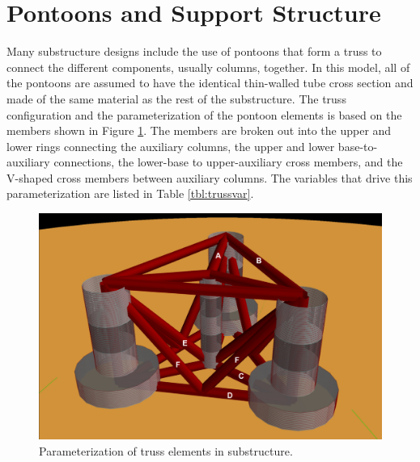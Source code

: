 \section{Pontoons and Support Structure}
Many substructure designs include the use of pontoons that form a truss
to connect the different components, usually columns, together.  In this
model, all of the pontoons are assumed to have the identical thin-walled
tube cross section and made of the same material as the rest of the
substructure.  The truss configuration and the parameterization of the
pontoon elements is based on the members shown in Figure
\ref{fig:pontoon}.  The members are broken out into the upper and lower
rings connecting the auxiliary columns, the upper and lower
base-to-auxiliary connections, the lower-base to upper-auxiliary cross
members, and the V-shaped cross members between auxiliary columns.  The
variables that drive this parameterization are listed in Table
\ref{tbl:trussvar}.
%
\begin{figure}[htb]
  \begin{center}
    \includegraphics[width=4.5in]{figs/semi.pdf}
    \caption{Parameterization of truss elements in substructure.}
    \label{fig:pontoon}
  \end{center}
\end{figure}
%
